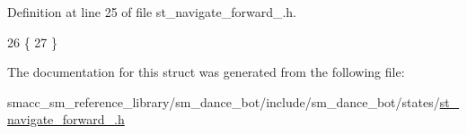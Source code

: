 Definition at line 25 of file st\+\_\+navigate\+\_\+forward\+\_.\+h.


\begin{DoxyCode}
26   \{
27   \}
\end{DoxyCode}


The documentation for this struct was generated from the following file\+:\begin{DoxyCompactItemize}
\item 
smacc\+\_\+sm\+\_\+reference\+\_\+library/sm\+\_\+dance\+\_\+bot/include/sm\+\_\+dance\+\_\+bot/states/\hyperlink{st__navigate__forward__2_8h}{st\+\_\+navigate\+\_\+forward\+\_.\+h}\end{DoxyCompactItemize}
